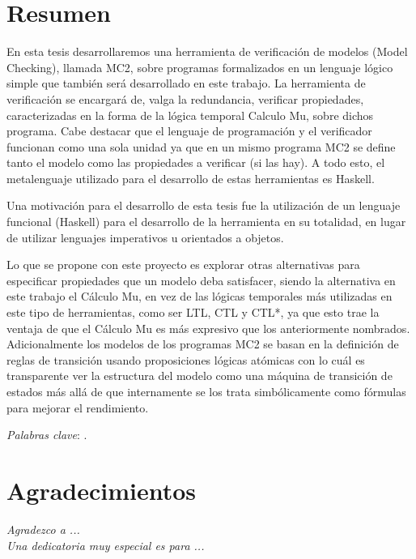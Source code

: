 % 
% 
%
\chapter*{Resumen}

En esta tesis desarrollaremos una herramienta de verificación de modelos (Model Checking), llamada MC2, sobre programas formalizados en un lenguaje lógico simple que también será desarrollado en este trabajo. La herramienta de verificación se encargará de, valga la redundancia, verificar propiedades, caracterizadas en la forma de la lógica temporal Calculo Mu, sobre dichos programa. Cabe destacar que el lenguaje de programación y el verificador funcionan como una sola unidad ya que en un mismo programa MC2 se define tanto el modelo como las propiedades a verificar (si las hay). A todo esto, el metalenguaje utilizado para el desarrollo de estas herramientas es Haskell.

Una motivación para el desarrollo de esta tesis fue la utilización de un lenguaje funcional (Haskell) para el desarrollo de la herramienta en su totalidad, en lugar de utilizar lenguajes imperativos u orientados a objetos.

Lo que se propone con este proyecto es explorar otras alternativas para especificar propiedades que un modelo deba satisfacer, siendo la alternativa en este trabajo el Cálculo Mu, en vez de las lógicas temporales más utilizadas en este tipo de herramientas, como ser LTL, CTL y CTL*, ya que esto trae la ventaja de que el Cálculo Mu es más expresivo que los anteriormente nombrados. Adicionalmente los modelos de los programas MC2 se basan en la definición de reglas de transición usando proposiciones lógicas atómicas con lo cuál es transparente ver la estructura del modelo como una máquina de transición de estados más allá de que internamente se los trata simbólicamente como fórmulas para mejorar el rendimiento.


\emph{Palabras clave}: .

\thispagestyle{empty} %

\chapter*{Agradecimientos}

{\sl Agradezco a ...}\\

{\sl Una dedicatoria muy especial es para ...}\\

